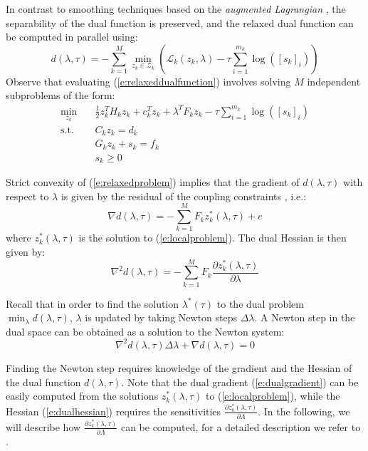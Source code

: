 In contrast to smoothing techniques based on the \emph{augmented Lagrangian} \cite{Kozma2013}, the separability of the dual function is preserved, and the relaxed dual function can be computed in parallel using:
\begin{equation}
\label{e:relaxeddualfunction}
d(\lambda, \tau) = -\sum_{k=1}^M \min_{z_k \in \mathcal{Z}_k} \left( \mathcal{L}_k(z_k, \lambda) - \tau \sum_{i=1}^{m_k} \log([s_k]_i) \right)
\end{equation}
Observe that evaluating (\ref{e:relaxeddualfunction}) involves solving $M$ independent subproblems of the form:
\begin{equation}
\label{e:localproblem}
\begin{aligned}
\min_{z_k} & \quad \frac{1}{2}z_k^T H_k z_k + c_k^T z_k + \lambda^TF_k z_k - \tau \sum_{i=1}^{m_k} \log([s_k]_i) \\
\text{s.t.} & \quad C_k z_k = d_k \\ 
& \quad G_k z_k + s_k = f_k \\
& \quad s_k \geq 0
\end{aligned}
\end{equation}

Strict convexity of (\ref{e:relaxedproblem}) implies that the gradient of $d(\lambda, \tau)$ with respect to $\lambda$ is given by the residual of the coupling constraints \cite{Bertsekas1989}, i.e.:
\begin{equation}
\label{e:dualgradient}
\nabla d(\lambda, \tau) = -\sum_{k=1}^M F_k z_k^*(\lambda, \tau) + e
\end{equation}
where $z_k^*(\lambda, \tau)$ is the solution to (\ref{e:localproblem}).
The dual Hessian is then given by:
\begin{equation}
\label{e:dualhessian}
\nabla^2 d(\lambda, \tau) = -\sum_{k=1}^M F_k \frac{\partial z_k^*(\lambda, \tau)}{\partial \lambda}
\end{equation}

Recall that in order to find the solution $\lambda^*(\tau)$ to the dual problem $\min_\lambda d(\lambda, \tau)$, $\lambda$ is updated by taking Newton steps $\Delta \lambda$. A Newton step in the dual space can be obtained as a solution to the Newton system:
\begin{equation}
\label{e:NewtonSystem}
\nabla^2 d(\lambda, \tau) \Delta \lambda + \nabla d(\lambda, \tau) = 0
\end{equation}

Finding the Newton step requires knowledge of the gradient and the Hessian of the dual function $d(\lambda, \tau)$. Note that the dual gradient (\ref{e:dualgradient}) can be easily computed from the solutions $z_k^*(\lambda, \tau)$ to (\ref{e:localproblem}), while the Hessian (\ref{e:dualhessian}) requires the sensitivities $\frac{\partial z_k^*(\lambda, \tau)}{\partial \Lambda}$. In the following, we will describe how $\frac{\partial z_k^*(\lambda, \tau)}{\partial \Lambda}$ can be computed, for a detailed description we refer to \cite{Klintberg2014}.


